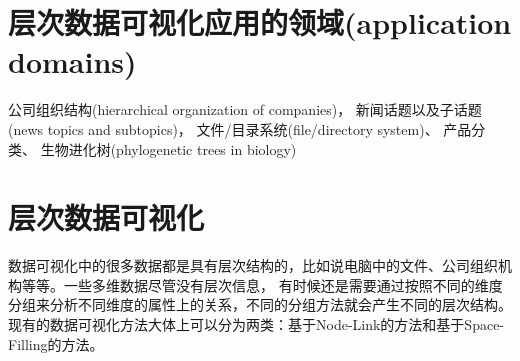 \documentclass{article}
\begin{document}
\normalem
\section{层次数据可视化应用的领域(application domains)}
公司组织结构(hierarchical organization of companies)，
新闻话题以及子话题(news topics and subtopics)，
文件/目录系统(file/directory system)、
产品分类、
生物进化树(phylogenetic trees in biology)


\section{层次数据可视化}
数据可视化中的很多数据都是具有层次结构的，比如说电脑中的文件、公司组织机构等等。一些多维数据尽管没有层次信息，
有时候还是需要通过按照不同的维度分组来分析不同维度的属性上的关系，不同的分组方法就会产生不同的层次结构。
现有的数据可视化方法大体上可以分为两类：基于Node-Link的方法和基于Space-Filling的方法。
\end{document}
